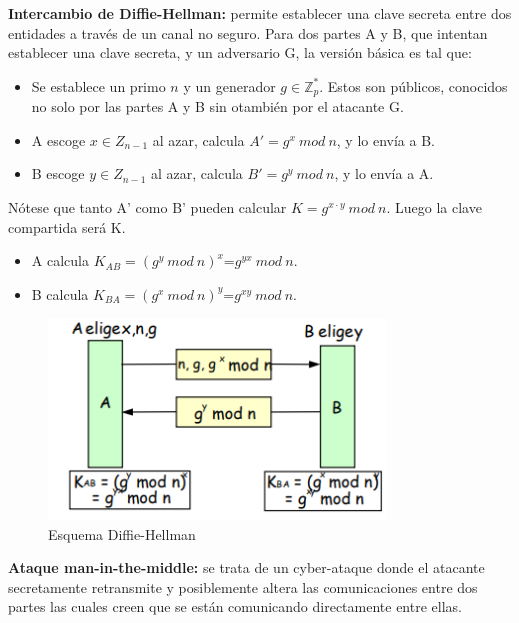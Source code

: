 \documentclass[a4paper,11pt]{article}
\begin{document}
\textbf{Intercambio de Diffie-Hellman:} permite establecer una clave secreta entre dos entidades a través de un canal no seguro. Para dos partes A y B, que intentan establecer una clave secreta, y un adversario G, la versión básica es tal que:

\begin{itemize}
\item Se establece un primo \textbf{$n$} y un generador \textbf{$g\in \mathbb{Z}_p^*$}. Estos son públicos, conocidos no solo por las partes A y B sin otambién por el atacante G.

\item A escoge \textbf{$x\in Z_{n-1}$} al azar, calcula $A'=g^x \> mod \> n$, y lo envía a B.

\item B escoge \textbf{$y \in Z_{n-1}$} al azar, calcula $B'=g^y\> mod \> n$, y lo envía a A.
\end{itemize}
Nótese que tanto A' como B' pueden calcular $K=g^{x\cdot y} \> mod \> n$. Luego la clave compartida será K.

\begin{itemize}
\item A calcula $K_{AB}=(g^y \> mod \> n)^x$=$g^{yx} \> mod \> n$.
\item B calcula $K_{BA}=(g^x \> mod \> n)^y$=$g^{xy} \> mod \> n$.
\end{itemize}

\begin{figure}[h]
\centering
\caption{Esquema Diffie-Hellman}
\includegraphics[scale=1,width=0.8\textwidth]{esquema_diffie_hellman.png}
\end{figure}

\textbf{Ataque man-in-the-middle:} se trata de un cyber-ataque donde el atacante secretamente retransmite y posiblemente altera las comunicaciones entre dos partes las cuales creen que se están comunicando directamente entre ellas.  \\
\end{document}
